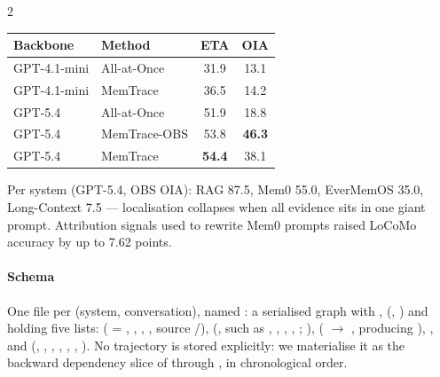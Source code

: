 \begin{multicols}{2}
\begin{center}\small
\begin{tabular}{@{}llcc@{}}\toprule
Backbone & Method & ETA & OIA\\\midrule
GPT-4.1-mini & All-at-Once & 31.9 & 13.1\\
GPT-4.1-mini & MemTrace & 36.5 & 14.2\\
GPT-5.4 & All-at-Once & 51.9 & 18.8\\
GPT-5.4 & MemTrace-OBS & 53.8 & \textbf{46.3}\\
GPT-5.4 & MemTrace & \textbf{54.4} & 38.1\\\bottomrule
\end{tabular}
\end{center}
Per system (GPT-5.4, OBS OIA): RAG 87.5, Mem0 55.0, EverMemOS 35.0, Long-Context 7.5 --- localisation collapses when all evidence sits in one giant prompt. Attribution signals used to rewrite Mem0 prompts raised LoCoMo accuracy by up to 7.62 points.

\paragraph{Schema} One file per (system, conversation), named  : a serialised  graph with ,  (, ) and  holding five lists:  ( = , , , , source /),  (,  such as , , , , ; ),  ( $\to$ , producing ), , and  (, , , , , , ). No trajectory is stored explicitly: we materialise it as the backward dependency slice of  through , in chronological order.
\end{multicols}

